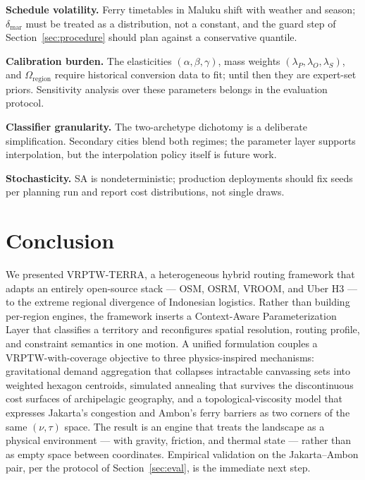 \documentclass[11pt,a4paper,twocolumn]{article}
\begin{document}
\textbf{Schedule volatility.} Ferry timetables in Maluku shift with
weather and season; $\delta_{\mathrm{mar}}$ must be treated as a
distribution, not a constant, and the guard step of
Section~\ref{sec:procedure} should plan against a conservative quantile.

\textbf{Calibration burden.} The elasticities
$(\alpha, \beta, \gamma)$, mass weights
$(\lambda_P, \lambda_O, \lambda_S)$, and
$\Omega_{\mathrm{region}}$ require historical conversion data to fit;
until then they are expert-set priors. Sensitivity analysis over these
parameters belongs in the evaluation protocol.

\textbf{Classifier granularity.} The two-archetype dichotomy is a
deliberate simplification. Secondary cities blend both regimes; the
parameter layer supports interpolation, but the interpolation policy
itself is future work.

\textbf{Stochasticity.} SA is nondeterministic; production deployments
should fix seeds per planning run and report cost distributions, not
single draws.

\section{Conclusion}
\label{sec:conclusion}

We presented VRPTW-TERRA, a heterogeneous hybrid routing framework that
adapts an entirely open-source stack --- OSM, OSRM, VROOM, and Uber H3 ---
to the extreme regional divergence of Indonesian logistics. Rather than
building per-region engines, the framework inserts a Context-Aware
Parameterization Layer that classifies a territory and reconfigures
spatial resolution, routing profile, and constraint semantics in one
motion. A unified formulation couples a VRPTW-with-coverage objective to
three physics-inspired mechanisms: gravitational demand aggregation that
collapses intractable canvassing sets into weighted hexagon centroids,
simulated annealing that survives the discontinuous cost surfaces of
archipelagic geography, and a topological-viscosity model that expresses
Jakarta's congestion and Ambon's ferry barriers as two corners of the same
$(\nu, \tau)$ space. The result is an engine that treats the landscape as
a physical environment --- with gravity, friction, and thermal state ---
rather than as empty space between coordinates. Empirical validation on
the Jakarta--Ambon pair, per the protocol of Section~\ref{sec:eval}, is
the immediate next step.
\end{document}
